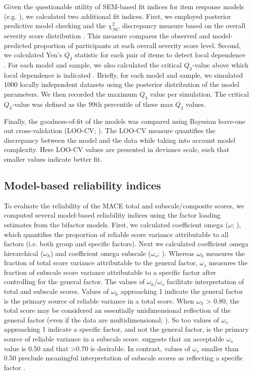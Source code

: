 \documentclass[letterpaper,man,natbib]{apa6}  %
\begin{document}
Given the questionable utility of SEM-based fit indices for item response models (e.g. \citealt{reise2014evaluating}), we calculated two additional fit indices. First, we employed posterior predictive model checking and the $\chi^2_{NC}$ discrepancy measure based on the overall severity score distribution \citep{sinharay2006posterior}. This measure compares the observed and model-predicted proportion of participants at each overall severity score level. Second, we calculated Yen's $Q_3$ statistic for each pair of items to detect local dependence \citep{yen1984effects}. For each model and sample, we also calculated the critical $Q_3$-value above which local dependence is indicated  \citep{christensen2017critical}. Briefly, for each model and sample, we simulated 1000 locally independent datasets using the posterior distribution of the model parameters. We then recorded the maximum $Q_3$ value per simulation. The critical $Q_3$-value was defined as the 99th percentile of these max $Q_3$ values. 

Finally, the goodness-of-fit of the models was compared using Bayesian leave-one out cross-validation (LOO-CV; \citealt{vehtari2017practical}). The LOO-CV measure quantifies the discrepancy between the model and the data while taking into account model complexity. Here LOO-CV values are presented in deviance scale, such that smaller values indicate better fit.

\subsection{Model-based reliability indices}

To evaluate the reliability of the MACE total and subscale/composite scores, we computed several model-based reliability indices using the factor loading estimates from the bifactor models. First, we calculated coefficient omega ($\omega$; \citealt{mcdonald1999test}), which quantifies the proportion of reliable score variance attributable to all factors (i.e. both group and specific factors). Next we calculated coefficient omega hierarchical ($\omega_h$) and coefficient omega subscale ($\omega_s$;  \citealt{reise2013applying, rodriguez2016evaluating}). Whereas $\omega_h$ measures the fraction of total score variance attributable to the general factor, $\omega_s$ measures the fraction of subscale score variance attributable to a specific factor after controlling for the general factor. The values of $\omega_h$/$\omega_s$ facilitate interpretation of total and subscale scores. Values of $\omega_h$ approaching 1 indicate the general factor is the primary source of reliable variance in a total score. When $\omega_h$ > 0.80, the total score may be considered an essentially unidimensional reflection of the general factor (even if the data are multidimensional;  \citealt{rodriguez2016applying}). So too values of $\omega_s$ approaching 1 indicate a specific factor, and not the general factor, is the primary source of reliable variance in a subscale score. \cite{canivez2016bifactor} suggests that an acceptable $\omega_s$ value is 0.50 and that >0.70 is desirable. In contrast, values of $\omega_s$ smaller than 0.50 preclude meaningful interpretation of subscale scores as reflecting a specific factor \citep{gignac2013bifactor}. 
\end{document}

